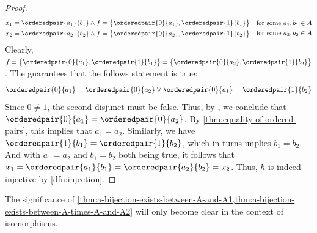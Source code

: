\begin{proof}
    \begin{equation*}
        \begin{aligned}
            x_{1} = \orderedpair{a_{1}}{b_{1}} \land f = \big\{ \orderedpair{0}{a_{1}},\orderedpair{1}{b_{1}} \big\}&\\
            x_{2} = \orderedpair{a_{2}}{b_{2}} \land f = \big\{ \orderedpair{0}{a_{2}},\orderedpair{1}{b_{2}} \big\}&
        \end{aligned}
        \text{}
        \begin{aligned}
            &\quad\text{for some \( a_{1},b_{1} \in A \)}\\
            &\quad\text{for some \( a_{2},b_{2} \in A \)}
        \end{aligned}
    \end{equation*}
    Clearly, \( f = \big\{ \orderedpair{0}{a_{1}},\orderedpair{1}{b_{1}} \big\} = \big\{ \orderedpair{0}{a_{2}},\orderedpair{1}{b_{2}} \big\}\).
    The  guarantees that the follows statement is true:
    \begin{equation*}
        \orderedpair{0}{a_{1}} = \orderedpair{0}{a_{2}} \lor
        \orderedpair{0}{a_{1}} = \orderedpair{1}{b_{2}}
    \end{equation*}
    Since \( 0 \neq 1 \), the second disjunct must be false.
    Thus, by , we conclude that \( \orderedpair{0}{a_{1}} = \orderedpair{0}{a_{2}}\).
    By \cref{thm:equality-of-ordered-pairs}, this implies that \( a_{1} = a_{2} \). Similarly, we have
    \( \orderedpair{1}{b_{1}} = \orderedpair{1}{b_{2}} \), which in turns implies \( b_{1} = b_{2} \).
    And with \( a_{1} = a_{2} \) and \( b_{1} = b_{2} \) both being true,
    it follows that \( x_{1} = \orderedpair{a_{1}}{b_{1}} = \orderedpair{a_{2}}{b_{2}} = x_{2} \).
    Thus, \( h \) is indeed injective by \cref{dfn:injection}.
\end{proof}

\begin{rem}
    The significance of \cref{thm:a-bijection-exists-between-A-and-A1,thm:a-bijection-exists-between-A-times-A-and-A2}
    will only become clear in the context of isomorphisms.
\end{rem}


